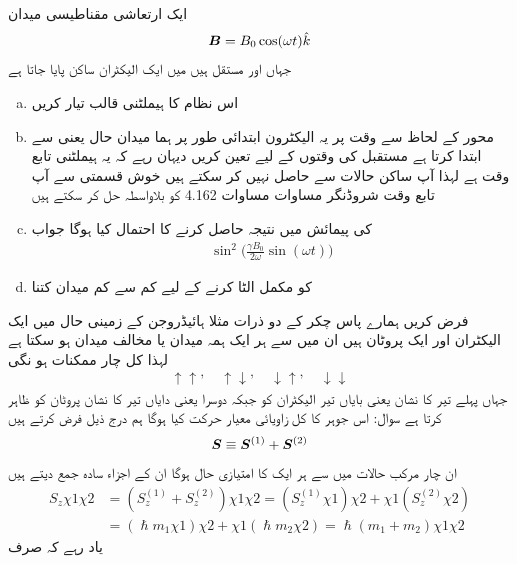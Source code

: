 ایک ارتعاشی مقناطیسی میدان 
\begin{align*}
{\ensuremath{{\boldsymbol{B}}}} = B_0 \cos(\omega t) \hat{k}
\end{align*}
جہاں  اور  مستقل ہیں میں ایک الیکٹران ساکن پایا جاتا ہے 
\begin{enumerate}[a.]
\item
اس نظام کا ہیملٹنی قالب تیار کریں 
\item
محور  کے لحاظ سے وقت  پر یہ الیکٹرون ابتدائی طور پر ہما میدان حال یعنی  سے ابتدا کرتا ہے مستقبل کی وقتوں کے لیے  تعین کریں دیہان رہے کہ یہ ہيملٹنی تابع وقت ہے لہذا آپ ساکن حالات سے  حاصل نہیں کر سکتے ہیں خوش قسمتی سے آپ تابع وقت شروڈنگر مساوات مساوات 4.162 کو بلاواسطہ حل کر سکتے ہیں 
\item
{} کی پیمائش میں  نتیجہ حاصل کرنے کا احتمال کیا ہوگا جواب 
\begin{align*}
\sin^2 \big ( \frac{\gamma B_0}{2 \omega} \sin(\omega t) \big )
\end{align*}
\item
{} کو مکمل الٹا کرنے کے لیے کم سے کم میدان  کتنا
\end{enumerate}
فرض کریں ہمارے پاس  چکر کے دو ذرات مثلا ہائیڈروجن کے زمینی حال میں ایک الیکٹران اور ایک پروٹان ہیں ان میں سے ہر ایک ہمہ میدان یا مخالف میدان ہو سکتا ہے لہذا کل چار ممکنات ہو نگی 
\begin{align}
\uparrow \uparrow, \quad \uparrow \downarrow, \quad \downarrow \uparrow, \quad \downarrow \downarrow
\end{align}
جہاں پہلے تیر کا نشان یعنی بایاں تیر الیکٹران کو جبکہ دوسرا یعنی دایاں تیر کا نشان پروٹان کو ظاہر کرتا ہے سوال: اس جوہر کا کل زاویائی معیار حرکت کیا ہوگا ہم درج ذیل فرض کرتے ہیں 
\begin{align} 
{\ensuremath{{\boldsymbol{S}}}} \equiv {\ensuremath{{\boldsymbol{S}}}}^{(1)} + {{\boldsymbol{S}}}^{(2)}
\end{align}
ان چار مرکب حالات میں سے ہر ایک  کا امتیازی حال ہوگا ان کے  اجزاء سادہ جمع دیتے ہیں
\begin{align*}
S_z \chi 1 \chi 2 &= (S_z^{(1)} + S_z^{(2)} ) \chi 1 \chi 2 = (S_z^{(1)} \chi 1) \chi 2 + \chi 1 (S_z^{(2)} \chi 2) \\
&= (\hslash m_1 \chi 1) \chi 2 + \chi 1 (\hslash m_2 \chi 2) = \hslash (m_1 + m_2) \chi 1 \chi 2
\end{align*}
یاد رہے کہ  صرف 
